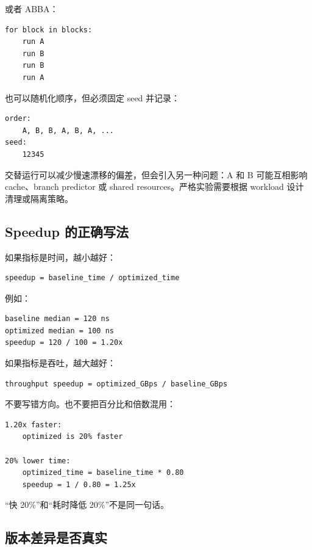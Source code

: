 或者 ABBA：

\begin{lstlisting}
for block in blocks:
    run A
    run B
    run B
    run A
\end{lstlisting}

也可以随机化顺序，但必须固定 seed 并记录：

\begin{lstlisting}
order:
    A, B, B, A, B, A, ...
seed:
    12345
\end{lstlisting}

\begin{deepdive}
交替运行可以减少慢速漂移的偏差，但会引入另一种问题：A 和 B 可能互相影响 cache、branch predictor 或 shared resources。严格实验需要根据 workload 设计清理或隔离策略。
\end{deepdive}

\subsection{Speedup 的正确写法}

如果指标是时间，越小越好：

\begin{lstlisting}
speedup = baseline_time / optimized_time
\end{lstlisting}

例如：

\begin{lstlisting}
baseline median = 120 ns
optimized median = 100 ns
speedup = 120 / 100 = 1.20x
\end{lstlisting}

如果指标是吞吐，越大越好：

\begin{lstlisting}
throughput speedup = optimized_GBps / baseline_GBps
\end{lstlisting}

不要写错方向。也不要把百分比和倍数混用：

\begin{lstlisting}
1.20x faster:
    optimized is 20% faster

20% lower time:
    optimized_time = baseline_time * 0.80
    speedup = 1 / 0.80 = 1.25x
\end{lstlisting}

“快 20\%”和“耗时降低 20\%”不是同一句话。

\subsection{版本差异是否真实}

